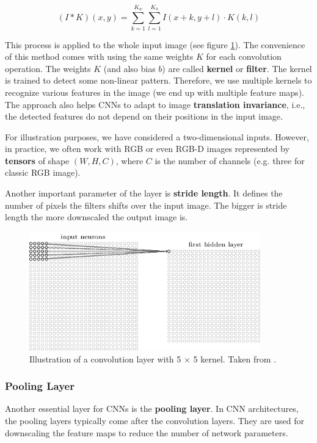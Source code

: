 $$
    (I * K)(x, y) = \sum\limits_{k = 1}^{K_w}\sum\limits_{l = 1}^{K_h}
    I(x + k, y + l) \cdot K(k, l)
$$

This process is applied to the whole input image (see figure
\ref{fig:convolution}). The convenience of this method comes with using the same
weights $K$ for each convolution operation. The weights $K$ (and also bias $b$)
are called \textbf{kernel} or \textbf{filter}. The kernel is trained to detect
some non-linear pattern. Therefore, we use multiple kernels to recognize
various features in the image (we end up with multiple feature maps). The
approach also helps CNNs to adapt to image \textbf{translation invariance},
i.e., the detected features do not depend on their positions in the input
image.

For illustration purposes, we have considered a two-dimensional inputs. However,
in practice, we often work with RGB or even RGB-D images represented by
\textbf{tensors} of shape $(W, H, C)$, where $C$ is the number of channels (e.g.
three for classic RGB image).

Another important parameter of the layer is \textbf{stride length}. It defines
the number of pixels the filters shifts over the input image. The bigger is
stride length the more downscaled the output image is.

\begin{figure}[h]
    \centering
    \includegraphics[width=10cm]{Sources/Figures/convolution.png}
    \caption{Illustration of a convolution layer with 5 $\times$ 5 kernel. Taken
        from \cite{nielsenneural}.}
    \label{fig:convolution}
\end{figure}

\subsubsection{Pooling Layer}
Another essential layer for CNNs is the \textbf{pooling layer}. In CNN
architectures, the pooling layers typically come after the convolution layers.
They are used for downscaling the feature maps to reduce the number of network
parameters.

